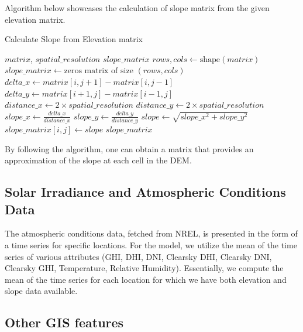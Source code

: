 \documentclass[a4paper,12pt]{Classes/RoboticsLaTeX}
\begin{document}
		Algorithm below showcases the calculation of slope matrix from the given elevation matrix.

		\begin{algorithm}[H]
			\caption{Calculate Slope from Elevation matrix}
			\begin{algorithmic}[1]
			\REQUIRE $matrix$, $spatial\_resolution$
			\ENSURE $slope\_matrix$
			\STATE $rows, cols \leftarrow \text{shape}(matrix)$
			\STATE $slope\_matrix \leftarrow \text{zeros matrix of size } (rows, cols)$
					\STATE $delta\_x \leftarrow matrix[i, j+1] - matrix[i, j-1]$
					\STATE $delta\_y \leftarrow matrix[i+1, j] - matrix[i-1, j]$
					\STATE $distance\_x \leftarrow 2 \times spatial\_resolution$
					\STATE $distance\_y \leftarrow 2 \times spatial\_resolution$
					\STATE $slope\_x \leftarrow \frac{delta\_x}{distance\_x}$
					\STATE $slope\_y \leftarrow \frac{delta\_y}{distance\_y}$
					\STATE $slope \leftarrow \sqrt{slope\_x^2 + slope\_y^2}$
					\STATE $slope\_matrix[i, j] \leftarrow slope$
				\ENDFOR
			\ENDFOR
			\RETURN $slope\_matrix$
			\end{algorithmic}
		\end{algorithm}

		By following the algorithm, one can obtain a matrix that provides an approximation of the slope at each cell in the DEM.

		

	\subsection{Solar Irradiance and Atmospheric Conditions Data}

	The atmospheric conditions data, fetched from \ac{NREL}, is presented in the form of a time series for specific locations. For the model, 
	we utilize the mean of the time series of various attributes (GHI, DHI, DNI, Clearsky DHI, Clearsky DNI, Clearsky GHI, Temperature, Relative Humidity). 
	Essentially, we compute the mean of the time series for each location for which we have both elevation and slope data available.


	\subsection{Other \ac{GIS} features}
\end{document}
